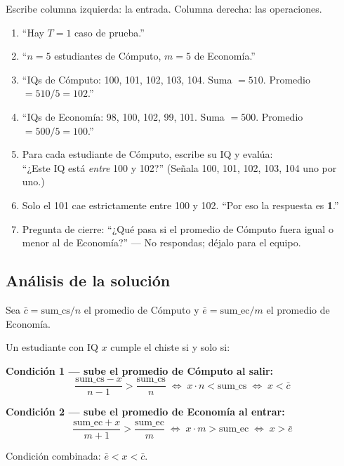 \documentclass[12pt, oneside]{article}
\begin{document}
\begin{notaprofesor}
  Escribe columna izquierda: la entrada.  Columna derecha: las operaciones.
  \begin{enumerate}
    \item ``Hay $T = 1$ caso de prueba.''
    \item ``$n = 5$ estudiantes de Cómputo, $m = 5$ de Economía.''
    \item ``IQs de Cómputo: 100, 101, 102, 103, 104.
           Suma $= 510$.  Promedio $= 510/5 = 102$.''
    \item ``IQs de Economía: 98, 100, 102, 99, 101.
           Suma $= 500$.  Promedio $= 500/5 = 100$.''
    \item Para cada estudiante de Cómputo, escribe su IQ y evalúa:\\
           ``¿Este IQ está \textit{entre} 100 y 102?''
           (Señala 100, 101, 102, 103, 104 uno por uno.)
    \item Solo el 101 cae estrictamente entre 100 y 102.
           ``Por eso la respuesta es \textbf{1}.''
    \item Pregunta de cierre: ``¿Qué pasa si el promedio de Cómputo
           fuera igual o menor al de Economía?''
           — No respondas; déjalo para el equipo.
  \end{enumerate}
\end{notaprofesor}

\subsection{Análisis de la solución}

Sea $\bar{c} = \text{sum\_cs}/n$ el promedio de Cómputo y
$\bar{e} = \text{sum\_ec}/m$ el promedio de Economía.

Un estudiante con IQ $x$ cumple el chiste si y solo si:

\medskip
\textbf{Condición 1 — sube el promedio de Cómputo al salir:}
\[
  \frac{\text{sum\_cs} - x}{n - 1} > \frac{\text{sum\_cs}}{n}
  \;\Longleftrightarrow\;
  x \cdot n < \text{sum\_cs}
  \;\Longleftrightarrow\;
  x < \bar{c}
\]

\textbf{Condición 2 — sube el promedio de Economía al entrar:}
\[
  \frac{\text{sum\_ec} + x}{m + 1} > \frac{\text{sum\_ec}}{m}
  \;\Longleftrightarrow\;
  x \cdot m > \text{sum\_ec}
  \;\Longleftrightarrow\;
  x > \bar{e}
\]

Condición combinada: $\bar{e} < x < \bar{c}$.
\end{document}

